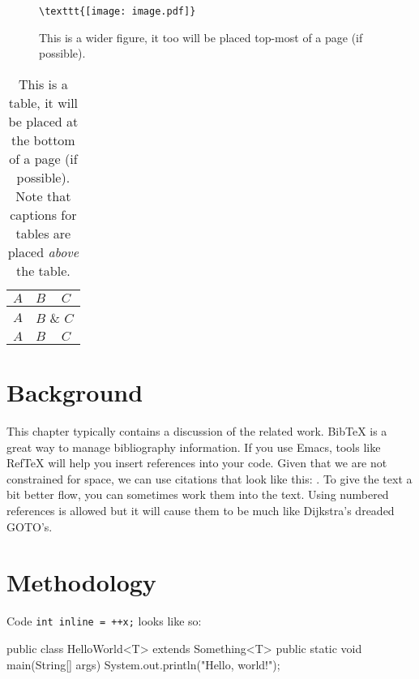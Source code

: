 \documentclass[11pt,titlepage,openright]{book}
\makeatletter
\renewenvironment{figure*}[1][]{%
  \begin{figure}[#1]%
    \checkoddpage%
    \ifoddpage%
      \begin{adjustwidth}{0cm}{-45mm}%
    \else%
      \begin{adjustwidth}{-45mm}{0cm}%
    \fi%
    }{%
    \end{adjustwidth}%
  \end{figure}}
\renewcommand{\c}[1]{\lstinline[style=std]@#1@}
\makeatother
\begin{document}
\begin{figure*}[t]
  \begin{center}
    \vspace*{1em}
    \verb+\texttt{[image: image.pdf]}+
    \vspace*{1em}
  \end{center}
\caption{This is a wider figure, it too will be placed top-most of a page (if possible).}
  \label{fig:example-1}
\end{figure*}


\begin{table}[b]
  \caption{This is a table, it will be placed at the bottom of a
    page (if possible). Note that captions for tables are placed
    \emph{above} the table.}
  \begin{center}
    \begin{tabular}{|l|l|l|}
      \hline
      $A$ & $B$ & $C$ \\
      \hline
      $A$ & \multicolumn{2}{|c|}{$B$ \& $C$} \\
      \hline
      $A$ & $B$ & $C$ \\
      \hline
    \end{tabular}
  \end{center}
  
  \label{tab:example-1}
\end{table}

\chapter{Background}

This chapter typically contains a discussion of the related work.
BibTeX is a great way to manage bibliography information. If you
use Emacs, tools like RefTeX will help you insert references into
your code. Given that we are not constrained for space, we can use
citations that look like this: \citep{Acm_Curriculum_2013,
  CWE_193}. To give the text a bit better flow, you can sometimes
work them into the text. Using numbered references is allowed but
it will cause them to be much like Dijkstra's
\citeyearpar{Dijkstra_1968} dreaded GOTO's.

\chapter{Methodology}
\lipsum[1] Code \c{int inline = ++x;} looks like so:

\begin{Code}
public class HelloWorld<T> extends Something<T> {
  public static void main(String[] args) {
    System.out.println("Hello, world!");
  }
}
\end{Code}
\end{document}

